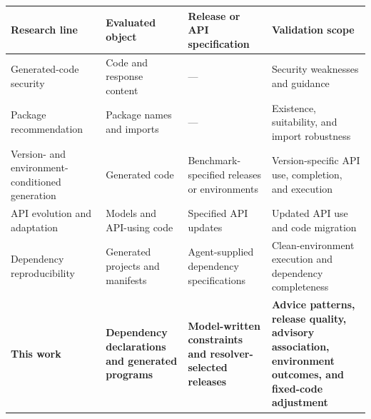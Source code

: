 \begin{tableorg}[!htbp]
\small
\centering
\caption{Representative research by evaluated object, release or API specification, and validation scope. A dash indicates that release or API specifications are not the primary focus.}
\label{tab:related_comparison}
\setlength{\tabcolsep}{5pt}
\renewcommand{\arraystretch}{1.16}
\begin{tabularx}{\textwidth}{@{}>{\raggedright\arraybackslash}p{}>{\raggedright\arraybackslash}p{}>{\raggedright\arraybackslash}p{}>{\raggedright\arraybackslash}X@{}}
\toprule
\textbf{Research line} & \textbf{Evaluated object} & \textbf{Release or API specification} & \textbf{Validation scope} \\
\midrule
Generated-code security~\citep{fu2025security,dai2025comprehensive,zhao2025cwe,sajadi2025security} & Code and response content & --- & Security weaknesses and guidance \\
\addlinespace
Package recommendation~\citep{spracklen2025package,latendresse2024chatgpt,latendresse2025robust,sipio2025popularity} & Package names and imports & --- & Existence, suitability, and import robustness \\
\midrule
Version- and environment-conditioned generation~\citep{wu2024versicode,misra2025gitchameleon,kuhar2025libevolution,wu2026environment} & Generated code & Benchmark-specified releases or environments & Version-specific API use, completion, and execution \\
\addlinespace
API evolution and adaptation~\citep{liu2025codeupdatearena,lin2025lightweight,11224651,10.1145/3808230} & Models and API-using code & Specified API updates & Updated API use and code migration \\
\midrule
Dependency reproducibility~\citep{vangala2026reproducible} & Generated projects and manifests & Agent-supplied dependency specifications & Clean-environment execution and dependency completeness \\
\midrule
\textbf{This work} & \textbf{Dependency declarations and generated programs} & \textbf{Model-written constraints and resolver-selected releases} & \textbf{Advice patterns, release quality, advisory association, environment outcomes, and fixed-code adjustment} \\
\bottomrule
\end{tabularx}
\end{tableorg}
